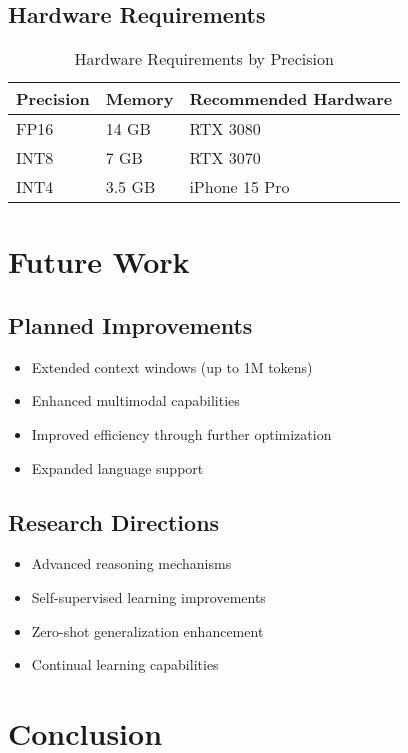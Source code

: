 \documentclass[11pt,a4paper]{article}
\begin{document}
\subsection{Hardware Requirements}
\begin{table}[H]
\centering
\begin{tabular}{lll}
\toprule
\textbf{Precision} & \textbf{Memory} & \textbf{Recommended Hardware} \\
\midrule
FP16 & 14 GB & RTX 3080 \\
INT8 & 7 GB & RTX 3070 \\
INT4 & 3.5 GB & iPhone 15 Pro \\
\bottomrule
\end{tabular}
\caption{Hardware Requirements by Precision}
\end{table}

\section{Future Work}

\subsection{Planned Improvements}
\begin{itemize}
    \item Extended context windows (up to 1M tokens)
    \item Enhanced multimodal capabilities
    \item Improved efficiency through further optimization
    \item Expanded language support
\end{itemize}

\subsection{Research Directions}
\begin{itemize}
    \item Advanced reasoning mechanisms
    \item Self-supervised learning improvements
    \item Zero-shot generalization enhancement
    \item Continual learning capabilities
\end{itemize}

\section{Conclusion}
\end{document}
